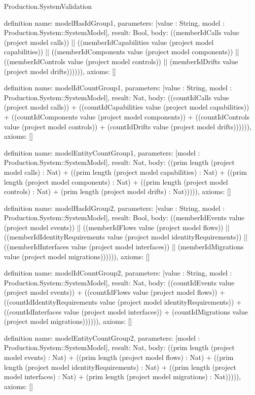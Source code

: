 \begin{lexlean}{Production.SystemValidation}
\begin{semanticmodule}
definition{
  name: modelHasIdGroup1,
  parameters: [value : String, model : Production.System::SystemModel],
  result: Bool,
  body: ((memberIdCalls value (project model calls)) || ((memberIdCapabilities value (project model capabilities)) || ((memberIdComponents value (project model components)) || ((memberIdControls value (project model controls)) || (memberIdDrifts value (project model drifts)))))),
  axioms: []
}

definition{
  name: modelIdCountGroup1,
  parameters: [value : String, model : Production.System::SystemModel],
  result: Nat,
  body: ((countIdCalls value (project model calls)) + ((countIdCapabilities value (project model capabilities)) + ((countIdComponents value (project model components)) + ((countIdControls value (project model controls)) + (countIdDrifts value (project model drifts)))))),
  axioms: []
}

definition{
  name: modelEntityCountGroup1,
  parameters: [model : Production.System::SystemModel],
  result: Nat,
  body: ((prim length (project model calls) : Nat) + ((prim length (project model capabilities) : Nat) + ((prim length (project model components) : Nat) + ((prim length (project model controls) : Nat) + (prim length (project model drifts) : Nat))))),
  axioms: []
}

definition{
  name: modelHasIdGroup2,
  parameters: [value : String, model : Production.System::SystemModel],
  result: Bool,
  body: ((memberIdEvents value (project model events)) || ((memberIdFlows value (project model flows)) || ((memberIdIdentityRequirements value (project model identityRequirements)) || ((memberIdInterfaces value (project model interfaces)) || (memberIdMigrations value (project model migrations)))))),
  axioms: []
}

definition{
  name: modelIdCountGroup2,
  parameters: [value : String, model : Production.System::SystemModel],
  result: Nat,
  body: ((countIdEvents value (project model events)) + ((countIdFlows value (project model flows)) + ((countIdIdentityRequirements value (project model identityRequirements)) + ((countIdInterfaces value (project model interfaces)) + (countIdMigrations value (project model migrations)))))),
  axioms: []
}

definition{
  name: modelEntityCountGroup2,
  parameters: [model : Production.System::SystemModel],
  result: Nat,
  body: ((prim length (project model events) : Nat) + ((prim length (project model flows) : Nat) + ((prim length (project model identityRequirements) : Nat) + ((prim length (project model interfaces) : Nat) + (prim length (project model migrations) : Nat))))),
  axioms: []
}


\end{semanticmodule}
\end{lexlean}
